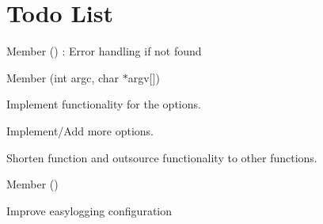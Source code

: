 \chapter{Todo List}
\hypertarget{todo}{}\label{todo}

\begin{DoxyRefList}
\item[Member \doxylink{classjson_1_1JSONHandler_a1ae1cbe7bc59d66590929c4ac5d1dfe3}{json\+::JSONHandler\+::assign\+Hide\+Shell} ()]\label{todo__todo000003}%
%
\+: Error handling if not found  
\item[Member \doxylink{classutils_1_1StartupHandler_a9cdd57841cee245c1a1c94b0efe6549c}{utils\+::Startup\+Handler\+::get\+Options} (int argc, char \texorpdfstring{$\ast$}{*}argv\mbox{[}\mbox{]})]\label{todo__todo000002}%
%

\begin{DoxyItemize}
\item Implement functionality for the options.
\item Implement/\+Add more options.
\item Shorten function and outsource functionality to other functions. 
\end{DoxyItemize}
\item[Member \doxylink{classutils_1_1StartupHandler_ade70b280d4385f270829b177da44b169}{utils\+::Startup\+Handler\+::init\+Easy\+Logging} ()]\label{todo__todo000001}%
%

\begin{DoxyItemize}
\item Improve easylogging configuration
\end{DoxyItemize}
\end{DoxyRefList}